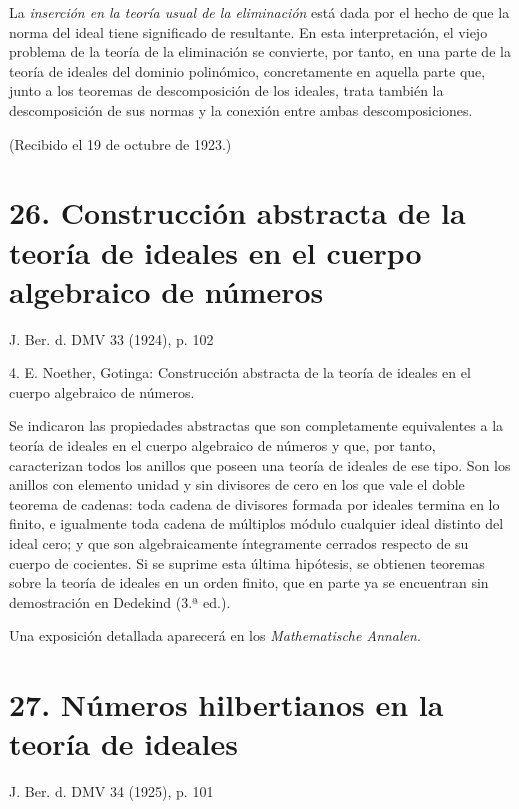 \documentclass[11pt]{article}
\begin{document}
La \emph{inserción en la teoría usual de la eliminación} está dada por el hecho de que la norma del ideal tiene significado de resultante. En esta interpretación, el viejo problema de la teoría de la eliminación se convierte, por tanto, en una parte de la teoría de ideales del dominio polinómico, concretamente en aquella parte que, junto a los teoremas de descomposición de los ideales, trata también la descomposición de sus normas y la conexión entre ambas descomposiciones.

\begin{center}
(Recibido el 19 de octubre de 1923.)
\end{center}

\section*{26. Construcción abstracta de la teoría de ideales en el cuerpo algebraico de números}

\begin{center}
J. Ber. d. DMV 33 (1924), p. 102
\end{center}

4. E. Noether, Gotinga: Construcción abstracta de la teoría de ideales en el cuerpo algebraico de números.

Se indicaron las propiedades abstractas que son completamente equivalentes a la teoría de ideales en el cuerpo algebraico de números y que, por tanto, caracterizan todos los anillos que poseen una teoría de ideales de ese tipo. Son los anillos con elemento unidad y sin divisores de cero en los que vale el doble teorema de cadenas: toda cadena de divisores formada por ideales termina en lo finito, e igualmente toda cadena de múltiplos módulo cualquier ideal distinto del ideal cero; y que son algebraicamente íntegramente cerrados respecto de su cuerpo de cocientes. Si se suprime esta última hipótesis, se obtienen teoremas sobre la teoría de ideales en un orden finito, que en parte ya se encuentran sin demostración en Dedekind (3.ª ed.).

Una exposición detallada aparecerá en los \emph{Mathematische Annalen}.

\section*{27. Números hilbertianos en la teoría de ideales}

\begin{center}
J. Ber. d. DMV 34 (1925), p. 101
\end{center}
\end{document}
